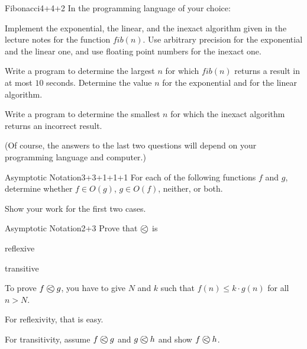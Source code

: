 \documentclass[a4paper]{article}
\begin{document}
\header

\begin{problem}{Fibonacci}{4+4+2}
In the programming language of your choice:

\begin{compactenum}
 \item Implement the exponential, the linear, and the inexact algorithm given in the lecture notes for the function $fib(n)$.
 Use arbitrary precision for the exponential and the linear one, and use floating point numbers for the inexact one.
 \item Write a program to determine the largest $n$ for which $fib(n)$ returns a result in at most $10$ seconds.
  Determine the value $n$ for the exponential and for the linear algorithm.
 \item Write a program to determine the smallest $n$ for which the inexact algorithm returns an incorrect result.
\end{compactenum}

(Of course, the answers to the last two questions will depend on your programming language and computer.)
\end{problem}

\begin{problem}{Asymptotic Notation}{3+3+1+1+1}
For each of the following functions $f$ and $g$, determine whether $f\in O(g)$, $g\in O(f)$, neither, or both.

\begin{compactenum}
 \item
 \item 
 \item
 \item
 \item
\end{compactenum}

Show your work for the first two cases.
\end{problem}

\begin{problem}{Asymptotic Notation}{2+3}
Prove that $\Oleq{}{}$ is
\begin{compactenum}
 \item reflexive
 \item transitive
\end{compactenum}

\begin{hint}
To prove $\Oleq{f}{g}$, you have to give $N$ and $k$ such that $f(n)\leq k\cdot g(n)$ for all $n>N$.

For reflexivity, that is easy.

For transitivity, assume $\Oleq{f}{g}$ and $\Oleq{g}{h}$ and show $\Oleq{f}{h}$.
\end{hint}
\end{problem}
\end{document}
